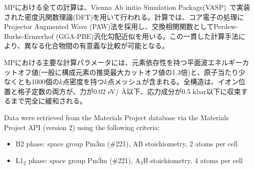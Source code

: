 \documentclass[a4paper,10pt,5p]{elsarticle}
\begin{document}
MPにおける全ての計算は、Vienna Ab initio Simulation Package(VASP)~\citep{kresse1996}で実装された密度汎関数理論(DFT)を用いて行われる。計算では、コア電子の処理にProjector Augmented Wave (PAW)法を採用し、交換相関関数としてPerdew-Burke-Ernzerhof (GGA-PBE)汎化勾配近似を用いる。この一貫した計算手法により、異なる化合物間の有意義な比較が可能となる。

MPにおける主要な計算パラメータには、元素依存性を持つ平面波エネルギーカットオフ値(一般に構成元素の推奨最大カットオフ値の1.3倍)と、原子当たり少なくとも1000個の$k$点密度を持つ$k$点メッシュが含まれる。全構造は、イオン位置と格子定数の両方が、力が0.02 eV/ \AA 以下、応力成分が0.5 kbar以下に収束するまで完全に緩和される。






Data were retrieved from the Materials Project database via the Materials Project API (version 2) using the following criteria:
\begin{itemize}
\setlength{\parskip}{0cm}
\setlength{\itemsep}{0cm}
    \item B2 phase: space group Pm$\bar{3}$m (\#221), AB stoichiometry, 2 atoms per cell
    \item L1$_2$ phase: space group Pm$\bar{3}$m (\#221), A$_3$B stoichiometry, 4 atoms per cell
\end{itemize}
\end{document}
